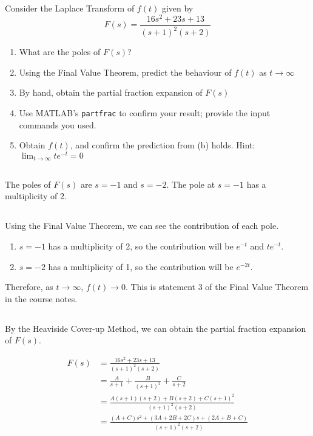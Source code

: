 \section{}
Consider the Laplace Transform of $f(t)$ given by
\[
    F(s) = \frac{16s^2 + 23s + 13}{(s + 1)^2(s + 2)}
\]

\begin{enumerate}[label=(\alph*)]
    \item What are the poles of $F(s)$?
    \item Using the Final Value Theorem, predict the behaviour of $f(t)$ as $t \to \infty$
    \item By hand, obtain the partial fraction expansion of $F(s)$
    \item Use MATLAB's \texttt{partfrac} to confirm your result; provide the input commands you used.
    \item Obtain $f(t)$, and confirm the prediction from (b) holds. Hint: $\lim_{t \to \infty} te^{-t} = 0$
\end{enumerate}

\subsection{}
The poles of $F(s)$ are $s = -1$ and $s = -2$. The pole at $s = -1$ has a multiplicity of 2.

\subsection{}
Using the Final Value Theorem, we can see the contribution of each pole.

\begin{enumerate}
    \item $s = -1$ has a multiplicity of 2, so the contribution will be $e^{-t}$ and $te^{-t}$.
    \item $s = -2$ has a multiplicity of 1, so the contribution will be $e^{-2t}$.
\end{enumerate}

Therefore, as $t \to \infty$, $f(t) \to 0$. This is statement 3 of the Final Value Theorem in the course notes.

\subsection{}
By the Heaviside Cover-up Method, we can obtain the partial fraction expansion of $F(s)$.

\[
\begin{aligned}
    F(s) &= \frac{16s^2 + 23s + 13}{(s + 1)^2(s + 2)} \\
    &= \frac{A}{s + 1} + \frac{B}{(s + 1)^2} + \frac{C}{s + 2} \\
    &= \frac{A(s + 1)(s + 2) + B(s + 2) + C(s + 1)^2}{(s + 1)^2(s + 2)} \\
    &= \frac{(A + C)s^2 + (3A + 2B + 2C)s + (2A + B + C)}{(s + 1)^2(s + 2)}
\end{aligned}
\]

